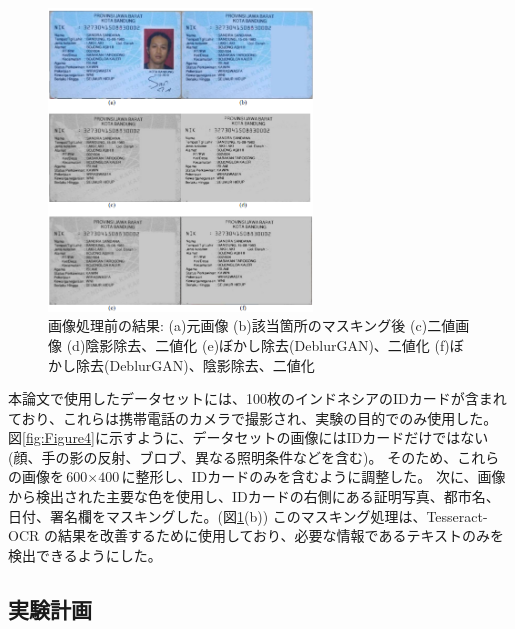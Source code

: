 \documentclass[uplatex, twocolumn,10pt]{jsarticle}
\begin{document}
\begin{figure}[t]
    \begin{center}
        \includegraphics*[width=7cm]{image/Figure5.png}
        \caption{画像処理前の結果: (a)元画像 (b)該当箇所のマスキング後 (c)二値画像 (d)陰影除去、二値化 (e)ぼかし除去(DeblurGAN)、二値化 (f)ぼかし除去(DeblurGAN)、陰影除去、二値化}
        \label{fig:Figure5}
    \end{center}
\end{figure}

本論文で使用したデータセットには、100枚のインドネシアのIDカードが含まれており、これらは携帯電話のカメラで撮影され、実験の目的でのみ使用した。
図\ref{fig:Figure4}に示すように、データセットの画像にはIDカードだけではない(顔、手の影の反射、ブロブ、異なる照明条件などを含む)。
そのため、これらの画像を$\text{600} \times \text{400}$に整形し、IDカードのみを含むように調整した。
次に、画像から検出された主要な色を使用し、IDカードの右側にある証明写真、都市名、日付、署名欄をマスキングした。(図\ref{fig:Figure5}(b))
このマスキング処理は、Tesseract-OCR の結果を改善するために使用しており、必要な情報であるテキストのみを検出できるようにした。


\subsection{実験計画}
\end{document}
